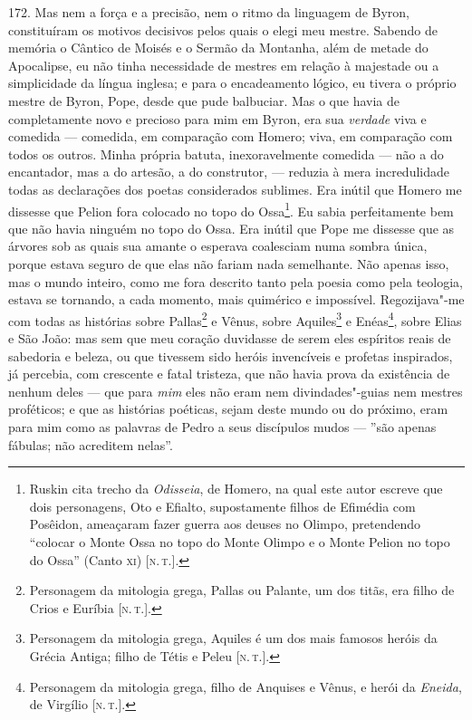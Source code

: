 172. Mas nem a força e a precisão, nem o ritmo da linguagem de Byron,
constituíram os motivos decisivos pelos quais o elegi meu mestre.
Sabendo de memória o Cântico de Moisés e o Sermão da Montanha, além de
metade do Apocalipse, eu não tinha necessidade de mestres em relação à
majestade ou a simplicidade da língua inglesa; e para o encadeamento
lógico, eu tivera o próprio mestre de Byron, Pope, desde que pude
balbuciar. Mas o que havia de completamente novo e precioso para mim em
Byron, era sua \emph{verdade} viva e comedida --- comedida, em comparação
com Homero; viva, em comparação com todos os outros. Minha própria
batuta, inexoravelmente comedida --- não a do encantador, mas a do
artesão, a do construtor, --- reduzia à mera incredulidade todas as
declarações dos poetas considerados sublimes. Era inútil que Homero me
dissesse que Pelion fora colocado no topo do Ossa\footnote{Ruskin cita
  trecho da \emph{Odisseia}, de Homero, na qual este autor escreve
  que dois personagens, Oto e Efialto, supostamente filhos de Efimédia com
  Posêidon, ameaçaram fazer guerra aos deuses no Olimpo, pretendendo
  ``colocar o Monte Ossa no topo do Monte Olimpo e o Monte Pelion no
  topo do Ossa'' (Canto \textsc{xi}) {[}\textsc{n.\,t.}{]}.}. Eu sabia perfeitamente bem
que não havia ninguém no topo do Ossa. Era inútil que Pope me dissesse
que as árvores sob as quais sua amante o esperava coalesciam numa sombra
única, porque estava seguro de que elas não fariam nada semelhante. Não
apenas isso, mas o mundo inteiro, como me fora descrito tanto pela
poesia como pela teologia, estava se tornando, a cada momento, mais
quimérico e impossível. Regozijava"-me com todas as histórias sobre
Pallas\footnote{Personagem da mitologia grega, Pallas ou Palante, um dos
  titãs, era filho de Crios e Euríbia {[}\textsc{n.\,t.}{]}.} e Vênus, sobre
Aquiles\footnote{Personagem da mitologia grega, Aquiles é um dos mais
  famosos heróis da Grécia Antiga; filho de Tétis e Peleu {[}\textsc{n.\,t.}{]}.} e Enéas\footnote{Personagem da mitologia grega, filho de
  Anquises e Vênus, e herói da \emph{Eneida}, de Virgílio {[}\textsc{n.\,t.}{]}.}, sobre Elias e São João: mas sem que meu coração duvidasse de
serem eles espíritos reais de sabedoria e beleza, ou que tivessem sido
heróis invencíveis e profetas inspirados, já percebia, com crescente e
fatal tristeza, que não havia prova da existência de nenhum deles --- que
para \emph{mim} eles não eram nem divindades"-guias nem mestres
proféticos; e que as histórias poéticas, sejam deste mundo ou do
próximo, eram para mim como as palavras de Pedro a seus discípulos mudos
--- ''são apenas fábulas; não acreditem nelas''.

